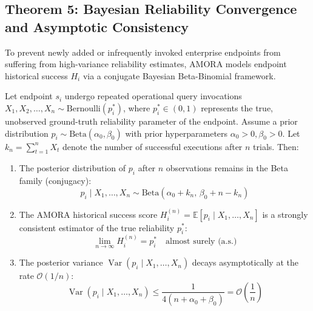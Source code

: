 \subsection{Theorem 5: Bayesian Reliability Convergence and Asymptotic Consistency}
\label{subsec:proof_bayesian}

To prevent newly added or infrequently invoked enterprise endpoints from suffering from high-variance reliability estimates, AMORA models endpoint historical success $H_i$ via a conjugate Bayesian Beta-Binomial framework.

\begin{theorem}
Let endpoint $s_i$ undergo repeated operational query invocations $X_1, X_2, \dots, X_n \sim \text{Bernoulli}(p_i^*)$, where $p_i^* \in (0, 1)$ represents the true, unobserved ground-truth reliability parameter of the endpoint. Assume a prior distribution $p_i \sim \text{Beta}(\alpha_0, \beta_0)$ with prior hyperparameters $\alpha_0 > 0, \beta_0 > 0$. Let $k_n = \sum_{t=1}^n X_t$ denote the number of successful executions after $n$ trials. Then:
\begin{enumerate}
    \item The posterior distribution of $p_i$ after $n$ observations remains in the Beta family (conjugacy):
    \begin{equation}
        p_i \mid X_1, \dots, X_n \sim \text{Beta}(\alpha_0 + k_n, \, \beta_0 + n - k_n)
    \end{equation}
    \item The AMORA historical success score $H_i^{(n)} = \mathbb{E}[p_i \mid X_1, \dots, X_n]$ is a strongly consistent estimator of the true reliability $p_i^*$:
    \begin{equation}
        \lim_{n \to \infty} H_i^{(n)} = p_i^* \quad \text{almost surely (a.s.)}
    \end{equation}
    \item The posterior variance $\operatorname{Var}(p_i \mid X_1, \dots, X_n)$ decays asymptotically at the rate $\mathcal{O}(1/n)$:
    \begin{equation}
        \operatorname{Var}(p_i \mid X_1, \dots, X_n) \le \frac{1}{4(n + \alpha_0 + \beta_0)} = \mathcal{O}\left( \frac{1}{n} \right)
    \end{equation}
\end{enumerate}
\end{theorem}

